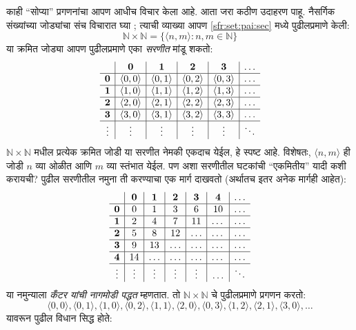 \documentclass[11pt,a4paper,openany]{book}
\theoremstyle{definition}
\newenvironment{explain}{}{}
\newcommand{\Setabs}[2]{\{#1:#2\}}
\newcommand{\tuple}[1]{\langle #1\rangle}
\newcommand{\Nat}{\mathbb{N}}
\begin{document}
\begin{explain}
काही ``सोप्या'' प्रगणनांचा आपण आधीच विचार केला आहे. आता जरा कठीण
उदाहरण पाहू. नैसर्गिक संख्यांच्या जोड्यांचा संच विचारात घ्या
; त्याची व्याख्या आपण
\ref{sfr:set:pai:sec} मध्ये पुढीलप्रमाणे केली:
\[
\Nat \times \Nat = \Setabs{\tuple{n,m}}{n,m \in \Nat}
\]
या क्रमित जोड्या आपण पुढीलप्रमाणे एका \emph{सरणीत} मांडू शकतो:
\[
\begin{array}{ c | c | c | c | c | c}
& \mathbf 0 & \mathbf 1 & \mathbf 2 & \mathbf 3 & \dots \\
\hline
\mathbf 0 & \tuple{0,0} & \tuple{0,1} & \tuple{0,2} & \tuple{0,3} & \dots \\
\hline
\mathbf 1 & \tuple{1,0} & \tuple{1,1} & \tuple{1,2} & \tuple{1,3} & \dots \\
\hline
\mathbf 2 & \tuple{2,0} & \tuple{2,1} & \tuple{2,2} & \tuple{2,3} & \dots \\
\hline
\mathbf 3 & \tuple{3,0} & \tuple{3,1} & \tuple{3,2} & \tuple{3,3} & \dots \\
\hline
\vdots & \vdots & \vdots & \vdots & \vdots & \ddots\\
\end{array}
\]
$\Nat \times \Nat$ मधील प्रत्येक क्रमित जोडी या सरणीत नेमकी एकदाच
येईल, हे स्पष्ट आहे. विशेषतः, $\tuple{n,m}$ ही जोडी $n$ व्या ओळीत
आणि $m$ व्या स्तंभात येईल. पण अशा सरणीतील घटकांची ``एकमितीय'' यादी
कशी करायची? पुढील सरणीतील नमुना ती करण्याचा एक मार्ग दाखवतो
(अर्थातच इतर अनेक मार्गही आहेत):
\[
\begin{array}{ c | c | c | c | c | c | c}
& \mathbf 0 & \mathbf 1 & \mathbf 2 & \mathbf 3 & \mathbf 4 &\dots \\
\hline
\mathbf 0 & 0  & 1& 3 & 6& 10 &\ldots \\
\hline
\mathbf 1 &2 & 4& 7 & 11 & \dots &\ldots \\
\hline
\mathbf 2 & 5 & 8 & 12 & \ldots & \dots&\ldots \\
\hline
\mathbf 3 & 9 & 13 & \ldots & \ldots & \dots & \ldots \\
\hline
\mathbf 4 & 14 & \ldots & \ldots & \ldots & \dots & \ldots \\
\hline
\vdots & \vdots & \vdots & \vdots & \vdots&\ldots & \ddots\\
\end{array}
\]\noindent
या नमुन्याला \emph{कँटर यांची नागमोडी पद्धत} म्हणतात. तो
$\Nat \times \Nat$ चे पुढीलप्रमाणे प्रगणन करतो:
\[
\tuple{0,0}, \tuple{0,1}, \tuple{1,0}, \tuple{0,2}, \tuple{1,1},
\tuple{2,0}, \tuple{0,3}, \tuple{1,2}, \tuple{2,1}, \tuple{3,0}, \dots
\]
यावरून पुढील विधान सिद्ध होते:
\end{explain}
\end{document}
